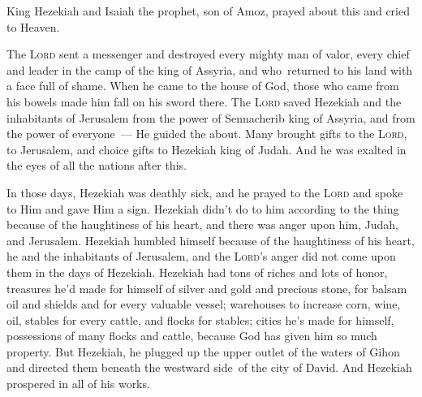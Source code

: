 \begin{inparaenum}
     King Hezekiah and Isaiah the prophet, son of Amoz, prayed about this and cried to Heaven.%
    
     The \textsc{Lord} sent a messenger and destroyed every mighty man of valor, every chief and leader in the camp of the king of Assyria, and who\understood\ returned to his land with a face full of shame. When he came to the house of God, those who came from his bowels made him fall on his sword there.%
     The \textsc{Lord} saved Hezekiah and the inhabitants of Jerusalem from the power of Sennacherib king of Assyria, and from the power of everyone~--- He guided the about.%
     Many brought gifts to the \textsc{Lord}, to Jerusalem, and choice gifts to Hezekiah king of Judah. And he was exalted in the eyes of all the nations after this.%
    
     In those days, Hezekiah was deathly sick, and he prayed to the \textsc{Lord} and spoke to Him and gave Him a sign.%
     Hezekiah didn't do to him according to the thing because of the haughtiness of his heart, and there was anger upon him, Judah, and Jerusalem.%
     Hezekiah humbled himself because of the haughtiness of his heart, he and the inhabitants of Jerusalem, and the \textsc{Lord}'s anger did not come upon them in the days of Hezekiah.%
     Hezekiah had tons of riches and lots of honor, treasures he'd made for himself of silver and gold and precious stone, for balsam oil and shields and for every valuable vessel;%
     warehouses to increase corn, wine, oil, stables for every cattle, and flocks for stables;%
     cities he's made for himself, possessions of many flocks and cattle, because God has given him so much property.%
     But Hezekiah, he plugged up the upper outlet of the waters of Gihon and directed them beneath the westward side\understood\ of the city of David. And Hezekiah prospered in all of his works.%
\end{inparaenum}
